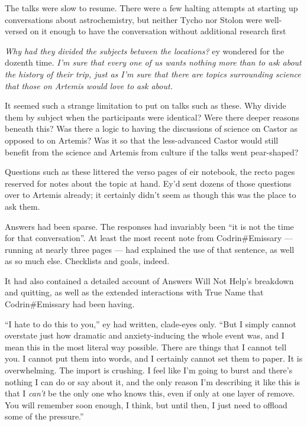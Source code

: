 The talks were slow to resume. There were a few halting attempts at starting up conversations about astrochemistry, but neither Tycho nor Stolon were well-versed on it enough to have the conversation without additional research first

\emph{Why had they divided the subjects between the locations?} ey wondered for the dozenth time. \emph{I'm sure that every one of us wants nothing more than to ask about the history of their trip, just as I'm sure that there are topics surrounding science that those on Artemis would love to ask about.}

It seemed such a strange limitation to put on talks such as these. Why divide them by subject when the participants were identical? Were there deeper reasons beneath this? Was there a logic to having the discussions of science on Castor as opposed to on Artemis? Was it so that the less-advanced Castor would still benefit from the science and Artemis from culture if the talks went pear-shaped?

Questions such as these littered the verso pages of eir notebook, the recto pages reserved for notes about the topic at hand. Ey'd sent dozens of those questions over to Artemis already; it certainly didn't seem as though this was the place to ask them.

Answers had been sparse. The responses had invariably been ``it is not the time for that conversation''. At least the most recent note from Codrin\#Emissary — running at nearly three pages — had explained the use of that sentence, as well as so much else. Checklists and goals, indeed.

It had also contained a detailed account of Answers Will Not Help's breakdown and quitting, as well as the extended interactions with True Name that Codrin\#Emissary had been having.

``I hate to do this to you,'' ey had written, clade-eyes only. ``But I simply cannot overstate just how dramatic and anxiety-inducing the whole event was, and I mean this in the most literal way possible. There are things that I cannot tell you. I cannot put them into words, and I certainly cannot set them to paper. It is overwhelming. The import is crushing. I feel like I'm going to burst and there's nothing I can do or say about it, and the only reason I'm describing it like this is that I \emph{can't} be the only one who knows this, even if only at one layer of remove. You will remember soon enough, I think, but until then, I just need to offload some of the pressure.''

